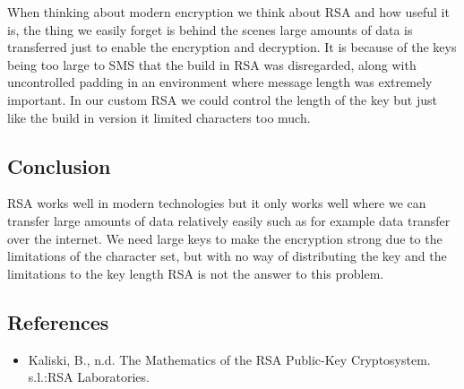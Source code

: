 When thinking about modern encryption we think about RSA and how useful it is, the thing we easily forget is behind the scenes large amounts of data is transferred just to enable the encryption and decryption. It is because of the keys being too large to SMS that the build in RSA was disregarded, along with uncontrolled padding in an environment where message length was extremely important. In our custom RSA we could control the length of the key but just like the build in version it limited characters too much.
\subsection*{Conclusion}

RSA works well in modern technologies but it only works well where we can transfer large amounts of data relatively easily such as for example data transfer over the internet. We need large keys to make the encryption strong due to the limitations of the character set, but with no way of distributing the key and the limitations to the key length RSA is not the answer to this problem.
\subsection*{References}
\begin{itemize}
\item Kaliski, B., n.d. The Mathematics of the RSA Public-Key Cryptosystem. s.l.:RSA Laboratories.
\end{itemize}